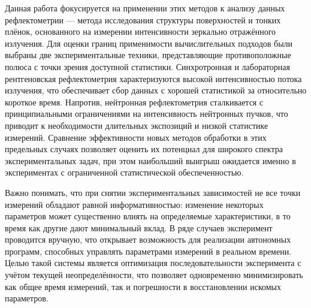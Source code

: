 \documentclass[a4paper]{article}
\begin{document}
Данная работа фокусируется на применении этих методов к анализу данных рефлектометрии — метода исследования структуры поверхностей и тонких плёнок, основанного на измерении интенсивности зеркально отражённого излучения. Для оценки границ применимости вычислительных подходов были выбраны две экспериментальные техники, представляющие противоположные полюса с точки зрения доступной статистики. Синхротронная и лабораторная рентгеновская рефлектометрия характеризуются высокой интенсивностью потока излучения, что обеспечивает сбор данных с хорошей статистикой за относительно короткое время. Напротив, нейтронная рефлектометрия сталкивается с принципиальными ограничениями на интенсивность нейтронных пучков, что приводит к необходимости длительных экспозиций и низкой статистике измерений. Сравнение эффективности новых методов обработки в этих предельных случаях позволяет оценить их потенциал для широкого спектра экспериментальных задач, при этом наибольший выигрыш ожидается именно в экспериментах с ограниченной статистической обеспеченностью.

Важно понимать, что при снятии экспериментальных зависимостей не все точки измерений обладают равной информативностью: изменение некоторых параметров может существенно влиять на определяемые характеристики, в то время как другие дают минимальный вклад. В ряде случаев эксперимент проводится вручную, что открывает возможность для реализации автономных программ, способных управлять параметрами измерений в реальном времени. Целью такой системы является оптимизация последовательности эксперимента с учётом текущей неопределённости, что позволяет одновременно минимизировать как общее время измерений, так и погрешности в восстановлении искомых параметров.
\end{document}
